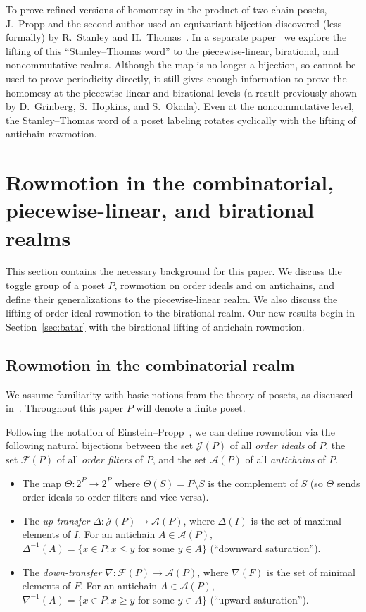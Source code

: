 \documentclass[10pt]{amsart}
\theoremstyle{definition}
\newcommand{\defn}[1]{\emph{#1}}
\newcommand{\ra}{\rightarrow}
\newcommand{\down}{\nabla}
\newcommand{\up}{\Delta}
\newcommand{\sm}{\setminus}
\newcommand{\cala}{\mathcal{A}}
\newcommand{\calf}{\mathcal{F}}
\newcommand{\calj}{\mathcal{J}}
\begin{document}
To prove refined versions of homomesy in the product of two chain posets, J.~Propp and the
second author used an equivariant bijection discovered (less formally) by R.~Stanley and
H.~Thomas~\cite[\S~7]{propproby}. 
In a separate paper~\cite{STword} we explore the lifting of this ``Stanley--Thomas word'' to the
piecewise-linear, birational, and noncommutative realms. Although the map is no longer a
bijection, so cannot be used to prove periodicity directly, it still gives enough
information to prove the homomesy at the piecewise-linear and birational levels (a result
previously shown by D.~Grinberg, S.~Hopkins, and S.~Okada). Even at the noncommutative
level, the Stanley--Thomas word of a poset labeling rotates cyclically with the lifting of
antichain rowmotion.


\section{Rowmotion in the combinatorial, piecewise-linear, and birational realms}\label{sec:jungle rollers}

This section contains the necessary background for this paper.
We discuss the toggle group of a poset $P$, rowmotion on order ideals and on antichains, and
define their
generalizations to the piecewise-linear realm. We also discuss the lifting of order-ideal
rowmotion to the birational realm. 
Our new results begin in Section~\ref{sec:batar} with the birational lifting of
antichain rowmotion.

\subsection{Rowmotion in the combinatorial realm}

We assume familiarity with basic notions from the theory of posets,
as discussed in~\cite[Ch.~3]{ec1ed2}.
Throughout this paper $P$ will denote a finite poset.

Following the notation of Einstein--Propp~\cite{einpropp}, we can define rowmotion via the
following natural bijections between the set $\calj(P)$ of all 
\emph{order ideals} of $P$, the set $\calf(P)$ of all \emph{order filters} of $P$, and the set $\cala(P)$ of
all \emph{antichains} of $P$. 
\begin{itemize}
\item The map $\Theta: 2^P \ra 2^P$ where $\Theta(S) = P\sm S$ is the complement of $S$ (so $\Theta$ sends order ideals to order filters and vice versa).
\item The \defn{up-transfer} $\up:\calj(P) \ra \cala(P)$, where $\up(I)$ is the set of maximal elements of $I$. For an antichain $A\in\cala(P)$,
$\up^{-1}(A)=\{x\in P: x\leq y \text{ for some } y\in A\}$ (``downward saturation'').
\item The \defn{down-transfer} $\down:\calf(P) \ra \cala(P)$, where $\down(F)$ is the set of minimal elements of $F$. For an antichain $A\in\cala(P)$,
$\down^{-1}(A)=\{x\in P: x\geq y \text{ for some } y\in A\}$ (``upward saturation'').
\end{itemize}
\end{document}
